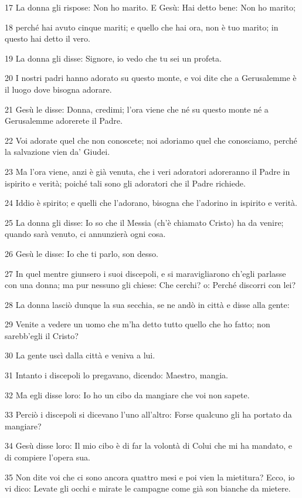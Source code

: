 \par 17 La donna gli rispose: Non ho marito. E Gesù: Hai detto bene: Non ho marito;
\par 18 perché hai avuto cinque mariti; e quello che hai ora, non è tuo marito; in questo hai detto il vero.
\par 19 La donna gli disse: Signore, io vedo che tu sei un profeta.
\par 20 I nostri padri hanno adorato su questo monte, e voi dite che a Gerusalemme è il luogo dove bisogna adorare.
\par 21 Gesù le disse: Donna, credimi; l'ora viene che né su questo monte né a Gerusalemme adorerete il Padre.
\par 22 Voi adorate quel che non conoscete; noi adoriamo quel che conosciamo, perché la salvazione vien da' Giudei.
\par 23 Ma l'ora viene, anzi è già venuta, che i veri adoratori adoreranno il Padre in ispirito e verità; poiché tali sono gli adoratori che il Padre richiede.
\par 24 Iddio è spirito; e quelli che l'adorano, bisogna che l'adorino in ispirito e verità.
\par 25 La donna gli disse: Io so che il Messia (ch'è chiamato Cristo) ha da venire; quando sarà venuto, ci annunzierà ogni cosa.
\par 26 Gesù le disse: Io che ti parlo, son desso.
\par 27 In quel mentre giunsero i suoi discepoli, e si maravigliarono ch'egli parlasse con una donna; ma pur nessuno gli chiese: Che cerchi? o: Perché discorri con lei?
\par 28 La donna lasciò dunque la sua secchia, se ne andò in città e disse alla gente:
\par 29 Venite a vedere un uomo che m'ha detto tutto quello che ho fatto; non sarebb'egli il Cristo?
\par 30 La gente uscì dalla città e veniva a lui.
\par 31 Intanto i discepoli lo pregavano, dicendo: Maestro, mangia.
\par 32 Ma egli disse loro: Io ho un cibo da mangiare che voi non sapete.
\par 33 Perciò i discepoli si dicevano l'uno all'altro: Forse qualcuno gli ha portato da mangiare?
\par 34 Gesù disse loro: Il mio cibo è di far la volontà di Colui che mi ha mandato, e di compiere l'opera sua.
\par 35 Non dite voi che ci sono ancora quattro mesi e poi vien la mietitura? Ecco, io vi dico: Levate gli occhi e mirate le campagne come già son bianche da mietere.

